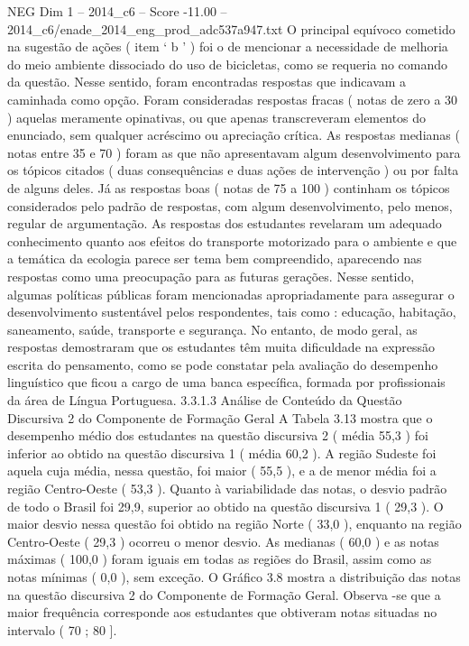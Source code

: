 \begin{textsample}{NEG Dim 1 – 2014\_c6 – Score -11.00 – 2014\_c6/enade\_2014\_eng\_prod\_adc537a947.txt}
O principal equívoco cometido na sugestão de ações ( item ‘ b ’ ) foi o de mencionar a necessidade de melhoria do meio ambiente dissociado do uso de bicicletas, como se requeria no comando da questão.
Nesse sentido, foram encontradas respostas que indicavam a caminhada como opção.
Foram consideradas respostas fracas ( notas de zero a 30 ) aquelas meramente opinativas, ou que apenas transcreveram elementos do enunciado, sem qualquer acréscimo ou apreciação crítica.
As respostas medianas ( notas entre 35 e 70 ) foram as que não apresentavam algum desenvolvimento para os tópicos citados ( duas consequências e duas ações de intervenção ) ou por falta de alguns deles.
Já as respostas boas ( notas de 75 a 100 ) continham os tópicos considerados pelo padrão de respostas, com algum desenvolvimento, pelo menos, regular de argumentação.
As respostas dos estudantes revelaram um adequado conhecimento quanto aos efeitos do transporte motorizado para o ambiente e que a temática da ecologia parece ser tema bem compreendido, aparecendo nas respostas como uma preocupação para as futuras gerações.
Nesse sentido, algumas políticas públicas foram mencionadas apropriadamente para assegurar o desenvolvimento sustentável pelos respondentes, tais como : educação, habitação, saneamento, saúde, transporte e segurança.
No entanto, de modo geral, as respostas demostraram que os estudantes têm muita dificuldade na expressão escrita do pensamento, como se pode constatar pela avaliação do desempenho linguístico que ficou a cargo de uma banca específica, formada por profissionais da área de Língua Portuguesa. 3.3.1.3 Análise de Conteúdo da Questão Discursiva 2 do Componente de Formação Geral A Tabela 3.13 mostra que o desempenho médio dos estudantes na questão discursiva 2 ( média 55,3 ) foi inferior ao obtido na questão discursiva 1 ( média 60,2 ).
A região Sudeste foi aquela cuja média, nessa questão, foi maior ( 55,5 ), e a de menor média foi a região Centro-Oeste ( 53,3 ).
Quanto à variabilidade das notas, o desvio padrão de todo o Brasil foi 29,9, superior ao obtido na questão discursiva 1 ( 29,3 ).
O maior desvio nessa questão foi obtido na região Norte ( 33,0 ), enquanto na região Centro-Oeste ( 29,3 ) ocorreu o menor desvio.
As medianas ( 60,0 ) e as notas máximas ( 100,0 ) foram iguais em todas as regiões do Brasil, assim como as notas mínimas ( 0,0 ), sem exceção.
O Gráfico 3.8 mostra a distribuição das notas na questão discursiva 2 do Componente de Formação Geral.
Observa -se que a maior frequência corresponde aos estudantes que obtiveram notas situadas no intervalo ( 70 ; 80 ].

\end{textsample}
